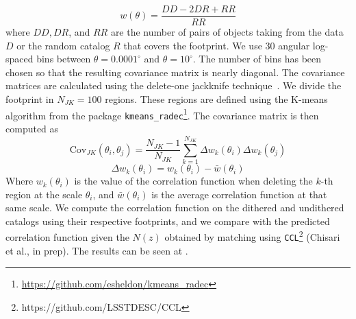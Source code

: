\documentclass[\docopts]{\docclass}
\begin{document}
\begin{equation}
w(\theta) = \frac{DD - 2 DR + RR}{RR}
\end{equation} 
where $DD, DR$, and $RR$ are the number of pairs of objects taking from the data $D$ or the random catalog $R$ that covers the footprint. We use 30 angular log-spaced bins between $\theta=0.0001^{\circ}$ and $\theta=10^{\circ}$. The number of bins has been chosen so that the resulting covariance matrix is nearly diagonal. The covariance matrices are calculated using the delete-one jackknife technique~\citep{Shao:1986:DJB,2009MNRAS.396...19N}. We divide the footprint in $N_{JK}=100$ regions. These regions are defined using the K-means algorithm from the package \texttt{kmeans\_radec}\footnote{\url{https://github.com/esheldon/kmeans\_radec}}. The covariance matrix is then computed as
\begin{equation}
\mathrm{Cov}_{JK}(\theta_{i},\theta_{j})=\frac{N_{JK}-1}{N_{JK}}\sum_{k=1}^{N_{JK}}\Delta w_{k}(\theta_{i}) \Delta w_{k}(\theta_{j})
\end{equation}
\begin{equation}
\Delta w_{k}(\theta_{i}) = w_{k}(\theta_{i})-\bar{w}(\theta_{i})
\end{equation}
Where $w_{k}(\theta_{i})$ is the value of the correlation function when deleting the $k$-th region at the scale $\theta_{i}$, and $\bar{w}(\theta_{i})$ is the average correlation function at that same scale. We compute the correlation function on the dithered and undithered catalogs using their respective footprints, and we compare with the predicted correlation function given the $N(z)$ obtained by matching using \texttt{CCL}\footnote{https://github.com/LSSTDESC/CCL} (Chisari et al., in prep). The results can be seen at . 

\end{document}
